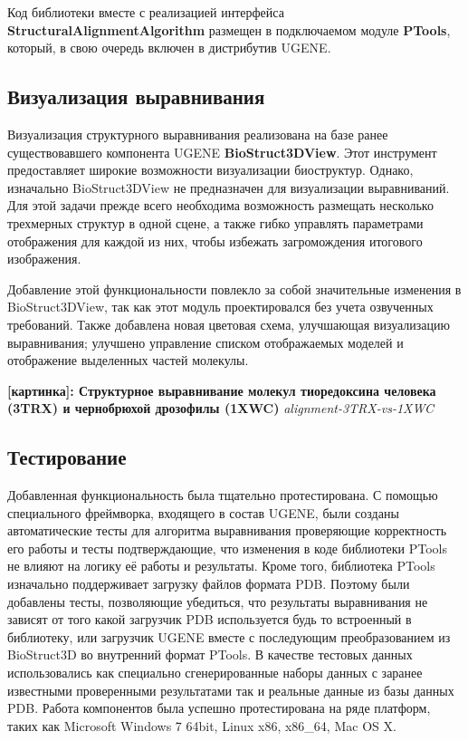 \documentclass[a4paper, 12pt, titlepage, utf8]{extarticle}
\newcommand{\class}{\textbf}
\newcommand{\module}{\class}
\newcommand{\myimage}[2]{   
    \begin{center} \textbf{[картинка]: #1} \textit{#2} \end{center} 
}
\begin{document}
Код библиотеки вместе с реализацией интерфейса \class{StructuralAlignmentAlgorithm} размещен в подключаемом модуле \module{PTools}, который, в свою очередь включен в дистрибутив UGENE.

\subsection{Визуализация выравнивания}
Визуализация структурного выравнивания реализована на базе ранее существовавшего компонента UGENE \module{BioStruct3DView}. Этот инструмент предоставляет широкие возможности визуализации биоструктур. Однако, изначально BioStruct3DView не предназначен для визуализации выравниваний. Для этой задачи прежде всего необходима возможность размещать несколько трехмерных структур в одной сцене, а также гибко управлять параметрами отображения для каждой из них, чтобы избежать загромождения итогового изображения. 

Добавление этой функциональности повлекло за собой значительные изменения в BioStruct3DView, так как этот модуль проектировался без учета озвученных требований. Также добавлена новая цветовая схема, улучшающая визуализацию выравнивания; улучшено управление списком отображаемых моделей и отображение выделенных частей молекулы.

\myimage{Структурное выравнивание молекул тиоредоксина человека (3TRX) и чернобрюхой дрозофилы (1XWC)}{alignment-3TRX-vs-1XWC}

\subsection{Тестирование}
Добавленная функциональность была тщательно протестирована. С помощью специального фреймворка, входящего в состав UGENE, были созданы автоматические тесты для алгоритма выравнивания проверяющие корректность его работы и тесты подтверждающие, что изменения в коде библиотеки PTools не влияют на логику её работы и результаты. Кроме того, библиотека PTools изначально поддерживает загрузку файлов формата PDB. Поэтому были добавлены тесты, позволяющие убедиться, что результаты выравнивания не зависят от того какой загрузчик PDB используется будь то встроенный в библиотеку, или загрузчик UGENE вместе с последующим преобразованием из BioStruct3D во внутренний формат PTools. В качестве тестовых данных использовались как специально сгенерированные наборы данных с заранее известными проверенными результатами так и реальные данные из базы данных PDB. Работа компонентов была успешно протестирована на ряде платформ, таких как Microsoft Windows 7 64bit, Linux x86, x86\_64, Mac OS X.
\end{document}
